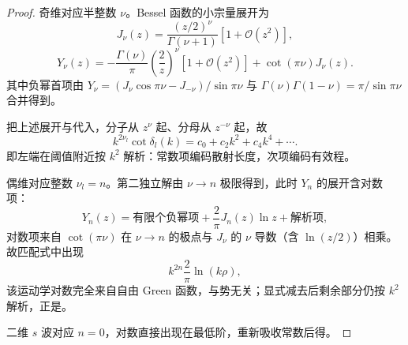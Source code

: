 \begin{proof}
奇维对应半整数 \(\nu\)。Bessel 函数的小宗量展开为
\begin{equation*}
 J_\nu(z)=\frac{(z/2)^\nu}{\Gamma(\nu+1)}[1+\mathcal O(z^2)],
\end{equation*}
\begin{equation*}
 Y_\nu(z)=
 -\frac{\Gamma(\nu)}\pi\left(\frac2z\right)^\nu[1+\mathcal O(z^2)]
 +\cot(\pi\nu)J_\nu(z).
\end{equation*}
其中负幂首项由 \(Y_\nu=(J_\nu\cos\pi\nu-J_{-\nu})/\sin\pi\nu\) 与 \(\Gamma(\nu)\Gamma(1-\nu)=\pi/\sin\pi\nu\) 合并得到。

把上述展开与代入，分子从 \(z^\nu\) 起、分母从 \(z^{-\nu}\) 起，故
\begin{equation*}
  k^{2\nu_l}\cot\delta_l(k)
  =c_0+c_2k^2+c_4k^4+\cdots .
\end{equation*}
即左端在阈值附近按 \(k^2\) 解析：常数项编码散射长度，次项编码有效程。

偶维对应整数 \(\nu_l=n\)。第二独立解由 \(\nu\to n\) 极限得到，此时 \(Y_n\) 的展开含对数项：
\begin{equation*}
 Y_n(z)
 =\text{有限个负幂项}
 +\frac2\pi J_n(z)\ln z
 +\text{解析项},
\end{equation*}
对数项来自 \(\cot(\pi\nu)\) 在 \(\nu\to n\) 的极点与 \(J_\nu\) 的 \(\nu\) 导数（含 \(\ln(z/2)\)）相乘。故匹配式中出现
\begin{equation*}
 k^{2n}\frac2\pi\ln(k\rho),
\end{equation*}
该运动学对数完全来自自由 Green 函数，与势无关；显式减去后剩余部分仍按 \(k^2\) 解析，正是。

二维 \(s\) 波对应 \(n=0\)，对数直接出现在最低阶，重新吸收常数后得。
\end{proof}

